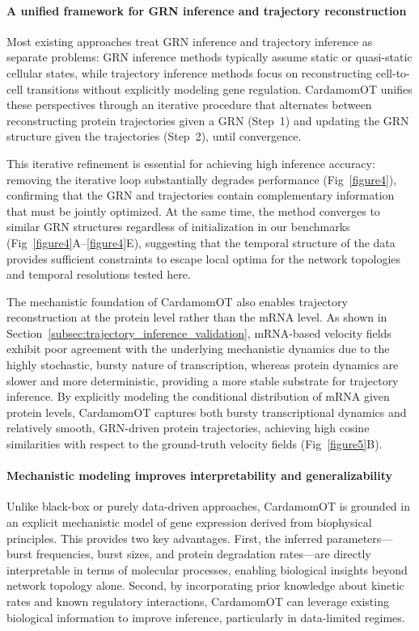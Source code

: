 \documentclass[a4paper, 11pt]{article}
\theoremstyle{plain}
\theoremstyle{remark}
\begin{document}
\paragraph{A unified framework for GRN inference and trajectory reconstruction}
Most existing approaches treat GRN inference and trajectory inference as separate problems: GRN inference methods typically assume static or quasi-static cellular states, while trajectory inference methods focus on reconstructing cell-to-cell transitions without explicitly modeling gene regulation. CardamomOT unifies these perspectives through an iterative procedure that alternates between reconstructing protein trajectories given a GRN (Step~1) and updating the GRN structure given the trajectories (Step~2), until convergence.

This iterative refinement is essential for achieving high inference accuracy: removing the iterative loop substantially degrades performance (Fig~\ref{figure4}), confirming that the GRN and trajectories contain complementary information that must be jointly optimized. At the same time, the method converges to similar GRN structures regardless of initialization in our benchmarks (Fig~\ref{figure4}A--\ref{figure4}E), suggesting that the temporal structure of the data provides sufficient constraints to escape local optima for the network topologies and temporal resolutions tested here.

The mechanistic foundation of CardamomOT also enables trajectory reconstruction at the protein level rather than the mRNA level. As shown in Section~\ref{subsec:trajectory_inference_validation}, mRNA-based velocity fields exhibit poor agreement with the underlying mechanistic dynamics due to the highly stochastic, bursty nature of transcription, whereas protein dynamics are slower and more deterministic, providing a more stable substrate for trajectory inference. By explicitly modeling the conditional distribution of mRNA given protein levels, CardamomOT captures both bursty transcriptional dynamics and relatively smooth, GRN-driven protein trajectories, achieving high cosine similarities with respect to the ground-truth velocity fields (Fig~\ref{figure5}B).

\paragraph{Mechanistic modeling improves interpretability and generalizability}
Unlike black-box or purely data-driven approaches, CardamomOT is grounded in an explicit mechanistic model of gene expression derived from biophysical principles. This provides two key advantages. First, the inferred parameters—burst frequencies, burst sizes, and protein degradation rates—are directly interpretable in terms of molecular processes, enabling biological insights beyond network topology alone. Second, by incorporating prior knowledge about kinetic rates and known regulatory interactions, CardamomOT can leverage existing biological information to improve inference, particularly in data-limited regimes.
\end{document}
